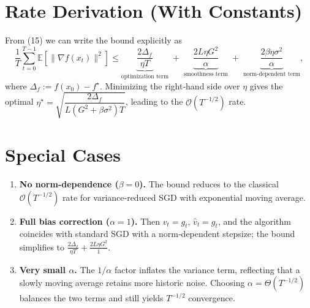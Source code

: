 \documentclass{article}
\newcommand{\E}{\mathbb{E}}
\begin{document}
\section*{Rate Derivation (With Constants)}
From (15) we can write the bound explicitly as
\[
\boxed{
\frac{1}{T}\sum_{t=0}^{T-1}\E[\|\nabla f(x_t)\|^2]
\le
\underbrace{\frac{2\Delta_f}{\eta T}}_{\text{optimization term}}
\;+\;
\underbrace{\frac{2L\eta G^2}{\alpha}}_{\text{smoothness term}}
\;+\;
\underbrace{\frac{2\beta\eta\sigma^2}{\alpha}}_{\text{norm‑dependent term}},
}
\]
where $\Delta_f:=f(x_0)-f^\star$.  Minimizing the right‑hand side over $\eta$ gives the optimal $\eta^\star = \sqrt{\dfrac{2\Delta_f}{L(G^2+\beta\sigma^2)T}}$, leading to the $\mathcal{O}(T^{-1/2})$ rate.

\section*{Special Cases}
\begin{enumerate}[noitemsep]
  \item \textbf{No norm‑dependence ($\beta=0$).} The bound reduces to the classical $\mathcal{O}(T^{-1/2})$ rate for variance‑reduced SGD with exponential moving average.
  \item \textbf{Full bias correction ($\alpha=1$).} Then $v_t=g_t$, $\hat v_t=g_t$, and the algorithm coincides with standard SGD with a norm‑dependent stepsize; the bound simplifies to
  $\frac{2\Delta_f}{\eta T}+\frac{2L\eta G^2}{1}$.
  \item \textbf{Very small $\alpha$.} The $1/\alpha$ factor inflates the variance term, reflecting that a slowly moving average retains more historic noise. Choosing $\alpha=\Theta(T^{-1/2})$ balances the two terms and still yields $T^{-1/2}$ convergence.
\end{enumerate}
\end{document}
